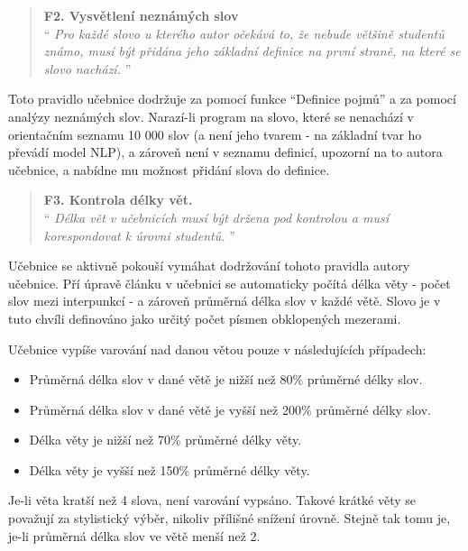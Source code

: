 \documentclass[12pt]{article}
\begin{document}
\filbreak

\begin{samepage}
	\begin{quotation}
		\textbf{F2. Vysvětlení neznámých slov} \\
		\enquote{\textit{
				Pro každé slovo u kterého autor očekává to, že nebude většině studentů známo, musí být přidána jeho základní definice na první straně, na které se slovo nachází.
		}}
	\end{quotation}

	Toto pravidlo učebnice dodržuje za pomocí funkce \enquote{Definice pojmů} a za pomocí analýzy neznámých slov. Narazí-li program na slovo, které se nenachází v orientačním seznamu 10 000 slov \cite{CNK} (a není jeho tvarem - na základní tvar ho převádí model NLP), a zároveň není v seznamu definicí, upozorní na to autora učebnice, a nabídne mu možnost přidání slova do definice.
\end{samepage}

\filbreak

\begin{samepage}
	\begin{quotation}
		\textbf{F3. Kontrola délky vět.} \\
		\enquote{\textit{
				Délka vět v učebnicích musí být držena pod kontrolou a musí korespondovat k úrovni studentů.
		}}
	\end{quotation}

	Učebnice se aktivně pokouší vymáhat dodržování tohoto pravidla autory učebnice. Pří úpravě článku v učebnici se automaticky počítá délka věty - počet slov mezi interpunkcí - a zároveň průměrná délka slov v každé větě. Slovo je v tuto chvíli definováno jako určitý počet písmen obklopených mezerami.
\end{samepage}

\filbreak

\begin{samepage}
	Učebnice vypíše varování nad danou větou pouze v následujících případech:

	\begin{itemize}
		\item Průměrná délka slov v dané větě je nižší než 80\% průměrné délky slov.
		\item Průměrná délka slov v dané větě je vyšší než 200\% průměrné délky slov.
		\item Délka věty je nižší než 70\% průměrné délky věty.
		\item Délka věty je vyšší než 150\% průměrné délky věty.
	\end{itemize}

	Je-li věta kratší než 4 slova, není varování vypsáno. Takové krátké věty se považují za stylistický výběr, nikoliv přílišné snížení úrovně. Stejně tak tomu je, je-li průměrná délka slov ve větě menší než 2.
\end{samepage}
\end{document}
